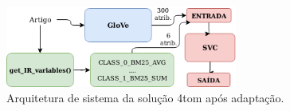 \begin{figure}[ht]
    \centering
    \caption{Arquitetura de sistema da solução 4\underscore{}tom após adaptação.}
    \begin{center}
        \includegraphics[width=0.68\textwidth]{img/4-tom-arquitetura-com-ri.png}
    \end{center}
    \vspace{-0.5cm}
    \label{fig:4-tom-arquitetura-com-ri}
\end{figure}